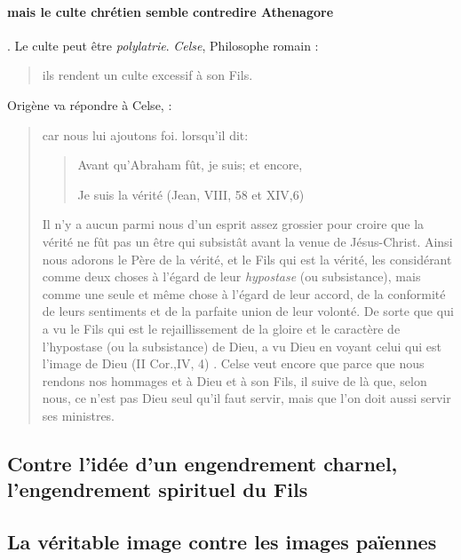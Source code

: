 \paragraph{mais le culte chrétien semble contredire Athenagore}. Le culte peut être \textit{polylatrie}. \textit{Celse}, Philosophe romain : 
\begin{quote}
    ils rendent un culte excessif à son Fils.
\end{quote}
Origène va répondre à Celse,  :
\begin{quote}
car nous lui ajoutons foi. lorsqu'il dit: 
\begin{quote}
    Avant qu'Abraham fût, je suis; et encore, 
    
    Je suis la vérité (Jean, VIII, 58 et XIV,6)
\end{quote} 
Il n'y a aucun parmi nous d'un esprit assez grossier pour croire que la vérité ne fût pas un être qui subsistât avant la venue de Jésus-Christ. Ainsi nous adorons le Père de la vérité, et le Fils qui est la vérité, les considérant comme deux choses à l'égard de leur \emph{hypostase} (ou subsistance), mais comme une seule et même chose à l'égard de leur accord, de la conformité de leurs sentiments et de la parfaite union de leur volonté. De sorte que qui a vu le Fils qui est le rejaillissement de la gloire et le caractère de l'hypostase (ou la subsistance) de Dieu, a vu Dieu en voyant celui qui est l'image de Dieu (II Cor.,IV, 4) . Celse veut encore que parce que nous rendons nos hommages et à Dieu et à son Fils, il suive de là que, selon nous, ce n'est pas Dieu seul qu'il faut servir, mais que l'on doit aussi servir ses ministres.
\end{quote}



\subsection{Contre l'idée d'un engendrement charnel, l'engendrement
    spirituel du Fils}
    
  
    
    \subsection{La véritable image contre les images païennes}
    
